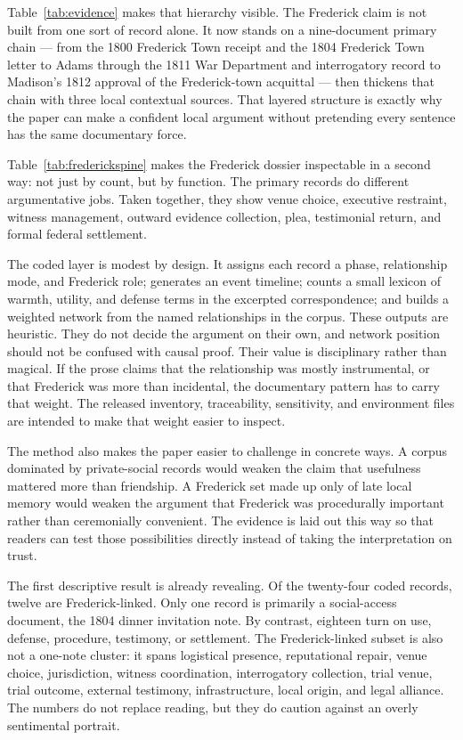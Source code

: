 

Table~\ref{tab:evidence} makes that hierarchy visible. The Frederick claim is not built from one sort of record alone. It now stands on a nine-document primary chain --- from the 1800 Frederick Town receipt and the 1804 Frederick Town letter to Adams through the 1811 War Department and interrogatory record to Madison's 1812 approval of the Frederick-town acquittal --- then thickens that chain with three local contextual sources. That layered structure is exactly why the paper can make a confident local argument without pretending every sentence has the same documentary force.



Table~\ref{tab:frederickspine} makes the Frederick dossier inspectable in a second way: not just by count, but by function. The primary records do different argumentative jobs. Taken together, they show venue choice, executive restraint, witness management, outward evidence collection, plea, testimonial return, and formal federal settlement.

The coded layer is modest by design. It assigns each record a phase, relationship mode, and Frederick role; generates an event timeline; counts a small lexicon of warmth, utility, and defense terms in the excerpted correspondence; and builds a weighted network from the named relationships in the corpus. These outputs are heuristic. They do not decide the argument on their own, and network position should not be confused with causal proof. Their value is disciplinary rather than magical. If the prose claims that the relationship was mostly instrumental, or that Frederick was more than incidental, the documentary pattern has to carry that weight. The released inventory, traceability, sensitivity, and environment files are intended to make that weight easier to inspect.

The method also makes the paper easier to challenge in concrete ways. A corpus dominated by private-social records would weaken the claim that usefulness mattered more than friendship. A Frederick set made up only of late local memory would weaken the argument that Frederick was procedurally important rather than ceremonially convenient. The evidence is laid out this way so that readers can test those possibilities directly instead of taking the interpretation on trust.



The first descriptive result is already revealing. Of the twenty-four coded records, twelve are Frederick-linked. Only one record is primarily a social-access document, the 1804 dinner invitation note. By contrast, eighteen turn on use, defense, procedure, testimony, or settlement. The Frederick-linked subset is also not a one-note cluster: it spans logistical presence, reputational repair, venue choice, jurisdiction, witness coordination, interrogatory collection, trial venue, trial outcome, external testimony, infrastructure, local origin, and legal alliance. The numbers do not replace reading, but they do caution against an overly sentimental portrait.
